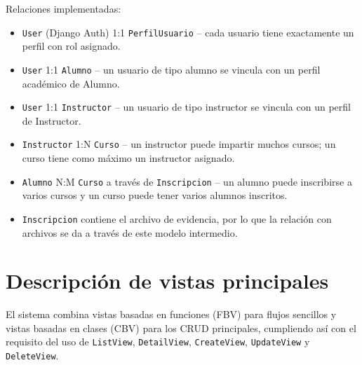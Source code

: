 \documentclass[11pt,letterpaper]{article}
\begin{document}
	Relaciones implementadas:
	\begin{itemize}[leftmargin=*]
		\item \texttt{User} (Django Auth) 1:1 \texttt{PerfilUsuario} -- cada usuario tiene exactamente un perfil con rol asignado.
		\item \texttt{User} 1:1 \texttt{Alumno} -- un usuario de tipo alumno se vincula con un perfil acad\'emico de Alumno.
		\item \texttt{User} 1:1 \texttt{Instructor} -- un usuario de tipo instructor se vincula con un perfil de Instructor.
		\item \texttt{Instructor} 1:N \texttt{Curso} -- un instructor puede impartir muchos cursos; un curso tiene como m\'aximo un instructor asignado.
		\item \texttt{Alumno} N:M \texttt{Curso} a trav\'es de \texttt{Inscripcion} -- un alumno puede inscribirse a varios cursos y un curso puede tener varios alumnos inscritos.
		\item \texttt{Inscripcion} contiene el archivo de evidencia, por lo que la relaci\'on con archivos se da a trav\'es de este modelo intermedio.
	\end{itemize}
	
	\section{Descripci\'on de vistas principales}
	El sistema combina vistas basadas en funciones (FBV) para flujos sencillos y vistas basadas en clases (CBV) para los CRUD principales, cumpliendo as\'i con el requisito del uso de \texttt{ListView}, \texttt{DetailView}, \texttt{CreateView}, \texttt{UpdateView} y \texttt{DeleteView}.
	
\end{document}
